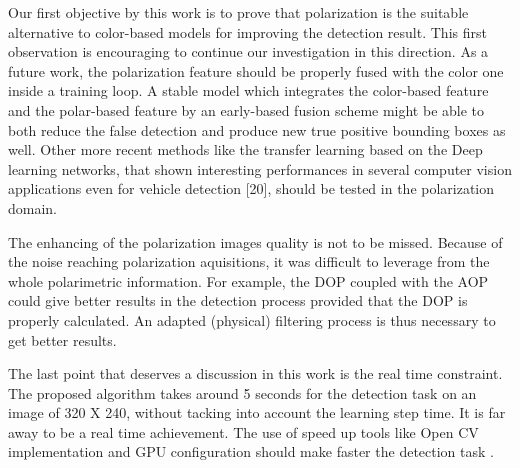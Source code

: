 \documentclass[10pt,twocolumn,letterpaper]{article}
\begin{document}
Our first objective by this work is to prove that polarization is the
suitable alternative to color-based models for improving the detection 
result. This first observation is encouraging to continue our 
investigation in this direction. As a future work, the polarization
feature should be properly fused
with the color one inside a training loop. A stable model
which integrates the color-based feature and the polar-based
feature by an early-based fusion scheme might be able to
both reduce the false detection and produce new true positive bounding
boxes as well. Other more recent methods like
the transfer learning based on the Deep learning networks,
that shown interesting performances in several computer vision 
applications even for vehicle detection [20], should be
tested in the polarization domain.

The enhancing of the polarization images quality is not to
be missed. Because of the noise reaching polarization aquisitions, it
was difficult to leverage from the whole polarimetric
information. For example, the DOP coupled with the AOP
could give better results in the detection process provided that
the DOP is properly calculated. An adapted (physical) filtering
process is thus necessary to get better results.

The last point that deserves a discussion in this work is
the real time constraint. The proposed algorithm takes around
5 seconds for the detection task on an image of 320 X 240,
without tacking into account the learning step time. It is far
away to be a real time achievement. The use of speed up tools
like Open CV implementation and GPU configuration should
make faster the detection task .




{\small


}
\end{document}
